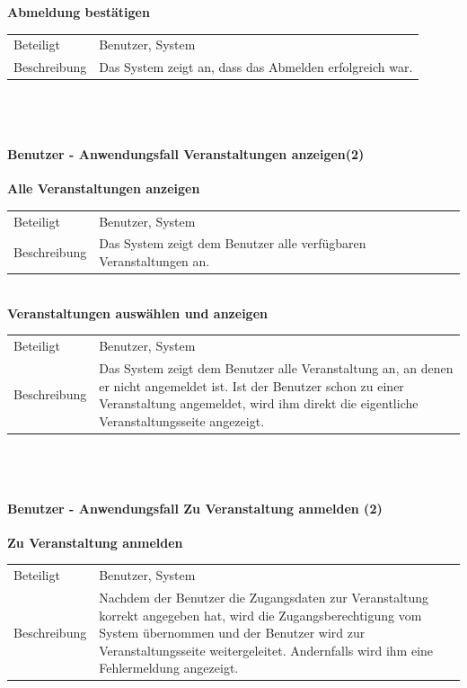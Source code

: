 \documentclass[12pt,a4paper]{article}
\begin{document}
\textbf{Abmeldung bestätigen}\\
\begin{tabular}{l|p{12cm}}
	\hline 
	Beteiligt & Benutzer, System \\ 
	Beschreibung &  Das System zeigt an, dass das Abmelden erfolgreich war. \\ 
\end{tabular}\\\\



\paragraph{Benutzer - Anwendungsfall \glqq Veranstaltungen anzeigen\grqq (2)}\mbox{}

\textbf{Alle Veranstaltungen anzeigen}\\
\begin{tabular}{l|p{12cm}}
	\hline 
	Beteiligt & Benutzer, System  \\ 
	Beschreibung & Das System zeigt dem Benutzer alle verfügbaren Veranstaltungen an. \\ 
\end{tabular}\\ 

\textbf{Veranstaltungen auswählen und anzeigen}\\
\begin{tabular}{l|p{12cm}}
	\hline 
	Beteiligt & Benutzer, System \\ 
	Beschreibung & Das System zeigt dem Benutzer alle Veranstaltung an, an denen er nicht angemeldet ist. Ist der Benutzer schon zu einer Veranstaltung angemeldet, wird ihm direkt die eigentliche Veranstaltungsseite angezeigt. \\ 
\end{tabular} \\\\

\newpage

\paragraph{Benutzer - Anwendungsfall \glqq Zu Veranstaltung anmelden \grqq (2)}\mbox{}

\textbf{Zu Veranstaltung anmelden}\\
\begin{tabular}{l|p{12cm}}
	\hline 
	Beteiligt & Benutzer, System \\ 
	Beschreibung & Nachdem der Benutzer die Zugangsdaten zur Veranstaltung korrekt angegeben hat, wird die Zugangsberechtigung vom System übernommen und der Benutzer wird zur Veranstaltungsseite weitergeleitet. Andernfalls wird ihm eine Fehlermeldung angezeigt.\\ 
\end{tabular}\\\\
\end{document}
